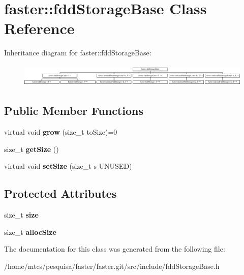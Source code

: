 \hypertarget{classfaster_1_1fddStorageBase}{}\section{faster\+:\+:fdd\+Storage\+Base Class Reference}
\label{classfaster_1_1fddStorageBase}
Inheritance diagram for faster\+:\+:fdd\+Storage\+Base\+:\begin{figure}[H]
\begin{center}
\leavevmode
\includegraphics[height=1.093750cm]{classfaster_1_1fddStorageBase}
\end{center}
\end{figure}
\subsection*{Public Member Functions}
\begin{DoxyCompactItemize}
\item 
\hypertarget{classfaster_1_1fddStorageBase_a8052833a8e5c933d14370c0c3ed6bdeb}{}\label{classfaster_1_1fddStorageBase_a8052833a8e5c933d14370c0c3ed6bdeb} 
virtual void {\bfseries grow} (size\+\_\+t to\+Size)=0
\item 
\hypertarget{classfaster_1_1fddStorageBase_adfcf6d4431323da59cebc65702dbb079}{}\label{classfaster_1_1fddStorageBase_adfcf6d4431323da59cebc65702dbb079} 
size\+\_\+t {\bfseries get\+Size} ()
\item 
\hypertarget{classfaster_1_1fddStorageBase_aa71da7a3babbd344210d1fcbb7b5e3dc}{}\label{classfaster_1_1fddStorageBase_aa71da7a3babbd344210d1fcbb7b5e3dc} 
virtual void {\bfseries set\+Size} (size\+\_\+t s U\+N\+U\+S\+ED)
\end{DoxyCompactItemize}
\subsection*{Protected Attributes}
\begin{DoxyCompactItemize}
\item 
\hypertarget{classfaster_1_1fddStorageBase_a02c7538275a50f7dd83330acc631a603}{}\label{classfaster_1_1fddStorageBase_a02c7538275a50f7dd83330acc631a603} 
size\+\_\+t {\bfseries size}
\item 
\hypertarget{classfaster_1_1fddStorageBase_a474fed6198e4bc7c41cdb2d464bb77ec}{}\label{classfaster_1_1fddStorageBase_a474fed6198e4bc7c41cdb2d464bb77ec} 
size\+\_\+t {\bfseries alloc\+Size}
\end{DoxyCompactItemize}


The documentation for this class was generated from the following file\+:\begin{DoxyCompactItemize}
\item 
/home/mtcs/pesquisa/faster/faster.\+git/src/include/fdd\+Storage\+Base.\+h\end{DoxyCompactItemize}
